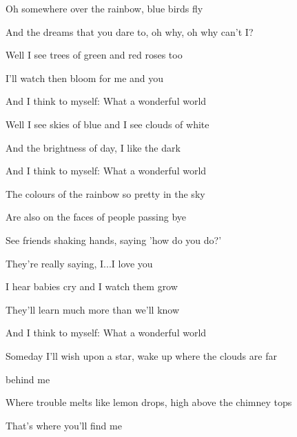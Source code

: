 \begin{song}
\bigskip

Oh somewhere over the rainbow, blue birds fly \par
{}And the dreams that you dare to, oh why, oh why can't I?  \par

\bigskip

Well I see trees of green and  red roses too \par
{} I'll watch then bloom for  me and you \par
And I  think to myself:  What a wonderful world  \par

\bigskip

Well I see skies of blue and I see  clouds of white \par
And the brightness of day,  I like the dark \par
And I  think to myself:  What a wonderful world  \par

\bigskip

The colours of the rainbow so pretty in the sky \par
Are also on the faces of people passing bye \par
See friends shaking hands, saying  'how do you do?' \par
{} They're really saying, I...I love you \par

\bigskip

I hear babies cry and I  watch them grow \par
{} They'll learn much more  than we'll know \par
And I  think to myself:  What a wonderful world  \par

\bigskip

Someday I'll wish upon a star, wake up where the clouds are far \par
behind me \par
Where trouble melts like lemon drops, high above the chimney tops \par
That's where you'll find me \par


\end{song}
